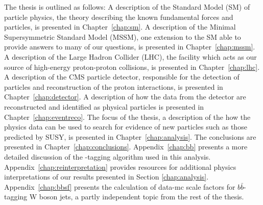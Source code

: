 The thesis is outlined as follows: A description of the Standard Model (SM) of particle physics, the theory describing the known fundamental forces and particles, is presented in Chapter~\ref{chap:sm}. A description of the Minimal Supersymmetric Standard Model (MSSM), one extension to the SM able to provide answers to many of our questions, is presented in Chapter~\ref{chap:mssm}. A description of the Large Hadron Collider (LHC), the facility which acts as our source of high-energy proton-proton collisions, is presented in Chapter~\ref{chap:lhc}. A description of the CMS particle detector, responsible for the detection of particles and reconstruction of the proton interactions, is presented in Chapter~\ref{chap:detector}. A description of how the data from the detector are reconstructed and identified as physical particles is presented in Chapter~\ref{chap:eventreco}. The focus of the thesis, a description of the how the physics data can be used to search for evidence of new particles such as those predicted by SUSY, is presented in Chapter~\ref{chap:analysis}. The conclusions are presented in Chapter~\ref{chap:conclusions}. Appendix~\ref{chap:bb} presents a more detailed discussion of the \bbbar-tagging algorithm used in this analysis. Appendix~\ref{chap:reinterpretation} provides resources for additional physics interpretations of our results presented in Section \ref{chap:analysis}. Appendix~\ref{chap:bbsf} presents the calculation of data-mc scale factors for $b\bar{b}$-tagging W boson jets, a partly independent topic from the rest of the thesis.
